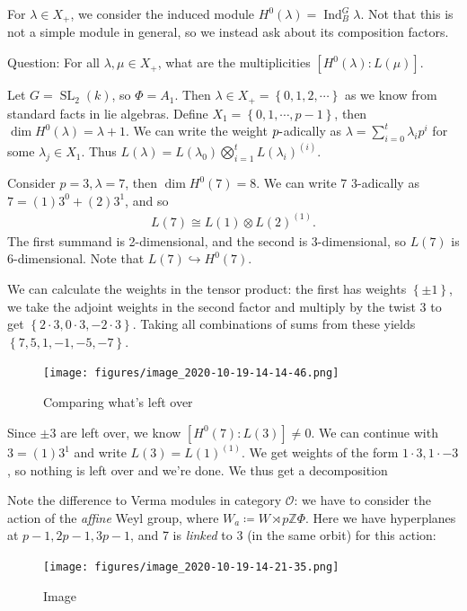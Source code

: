 For \(\lambda \in X_+\), we consider the induced module
\(H^0(\lambda) = \operatorname{Ind}_B^G \lambda\). Not that this is not
a simple module in general, so we instead ask about its composition
factors.

Question: For all \(\lambda, \mu \in X_+\), what are the multiplicities
\([H^0(\lambda): L(\mu)]\).

\begin{example}

Let \(G = {\operatorname{SL}}_2(k)\), so \(\Phi = A_1\). Then
\(\lambda \in X_+ = \left\{{0,1,2,\cdots}\right\}\) as we know from
standard facts in lie algebras. Define
\(X_1 = \left\{{0, 1, \cdots, p-1}\right\}\), then
\(\dim H^0(\lambda) = \lambda + 1\). We can write the weight
\(p{\hbox{-}}\)adically as \(\lambda = \sum_{i=0}^t \lambda_i p^i\) for
some \(\lambda_j\in X_1\). Thus
\(L(\lambda) = L(\lambda_0) \bigotimes_{i=1}^t L(\lambda_i)^{(i)}\).

Consider \(p=3, \lambda = 7\), then \(\dim H^0(7) = 8\). We can write
\(7\) 3-adically as \(7 = (1)3^0 + (2)3^1\), and so
\begin{align*}  
L(7) \cong L(1) \otimes L(2)^{(1)}
.\end{align*}
The first summand is 2-dimensional, and the second is 3-dimensional, so
\(L(7)\) is 6-dimensional. Note that \(L(7) \hookrightarrow H^0(7)\).

We can calculate the weights in the tensor product: the first has
weights \(\left\{{\pm 1}\right\}\), we take the adjoint weights in the
second factor and multiply by the twist 3 to get
\(\left\{{2\cdot 3, 0\cdot 3, -2\cdot 3}\right\}\). Taking all
combinations of sums from these yields
\(\left\{{7,5,1,-1,-5,-7}\right\}\).

\begin{figure}
\centering
\texttt{[image: figures/image\_2020-10-19-14-14-46.png]}
\caption{Comparing what's left over}
\end{figure}

Since \(\pm 3\) are left over, we know \([H^0(7): L(3)] \neq 0\). We can
continue with \(3 = (1)3^1\) and write \(L(3) = L(1)^{(1)}\). We get
weights of the form \(1\cdot 3, 1\cdot -3\), so nothing is left over and
we're done. We thus get a decomposition

\begin{center}
\end{center}

Note the difference to Verma modules in category \({\mathcal{O}}\): we
have to consider the action of the \emph{affine} Weyl group, where
\(W_a \coloneqq W \rtimes p{\mathbb{Z}}\Phi\). Here we have hyperplanes
at \(p-1, 2p-1, 3p-1\), and 7 is \emph{linked} to 3 (in the same orbit)
for this action:

\begin{figure}
\centering
\texttt{[image: figures/image\_2020-10-19-14-21-35.png]}
\caption{Image}
\end{figure}

\end{example}

